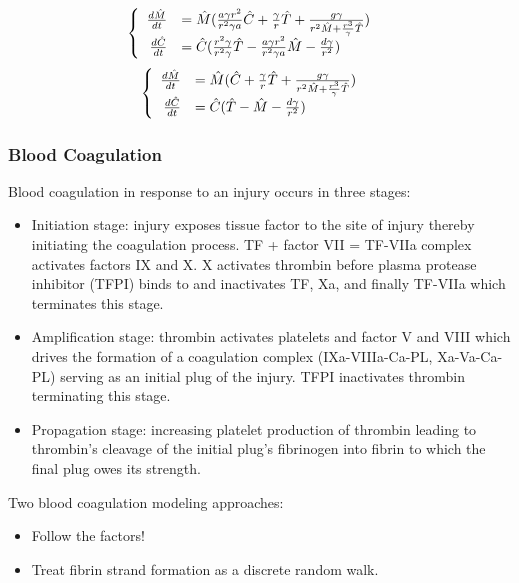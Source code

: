 \begin{frame}$$\begin{cases}
\begin{array}{rl}
\frac{d\HAT{M}}{dt}&= \HAT{M}(\frac{a\gamma r^2}{r^2\gamma a}\HAT{C}+\frac{\gamma}{r}\HAT{T}+\frac{g\gamma}{r^2\HAT{M}+ \frac{r^3}{\gamma}\HAT{T}}) \\ 
\frac{d\HAT{C}}{dt}&=\HAT{C}(\frac{r^2\gamma}{r^2\gamma}\HAT{T}-\frac{a\gamma r^2}{r^2\gamma a}\HAT{M}-\frac{d\gamma}{r^2})
\end{array} \end{cases}$$$$\begin{cases}
\begin{array}{rl}
\frac{d\HAT{M}}{dt}&= \HAT{M}(\HAT{C}+\frac{\gamma}{r}\HAT{T}+\frac{g\gamma}{r^2\HAT{M}+ \frac{r^3}{\gamma}\HAT{T}}) \\ 
\frac{d\HAT{C}}{dt}&=\HAT{C}(\HAT{T}-\HAT{M}-\frac{d\gamma}{r^2})
\end{array} \end{cases}$$
\end{frame}

\begin{frame}
  \frametitle{Blood Coagulation}
  Blood coagulation in response to an injury occurs in three stages: \begin{itemize}
  \item Initiation stage: injury exposes tissue factor to the site of injury thereby initiating the coagulation process. TF + factor VII = TF-VIIa complex activates factors IX and X. X activates thrombin before plasma protease inhibitor (TFPI) binds to and inactivates TF, Xa, and finally TF-VIIa which terminates this stage.\\
  \item Amplification stage: thrombin activates platelets and factor V and VIII which drives the formation of a coagulation complex (IXa-VIIIa-Ca-PL, Xa-Va-Ca-PL) serving as an initial plug of the injury. TFPI inactivates thrombin terminating this stage.\\
  \item Propagation stage: increasing platelet production of thrombin leading to thrombin's cleavage of the initial plug's fibrinogen into fibrin to which the final plug owes its strength.
  \end{itemize}
\end{frame}

\begin{frame}\Large
Two blood coagulation modeling approaches:\begin{itemize}\itemsep2pt
\item Follow the factors!
\item Treat fibrin strand formation as a discrete random walk.
\end{itemize}
\end{frame}


